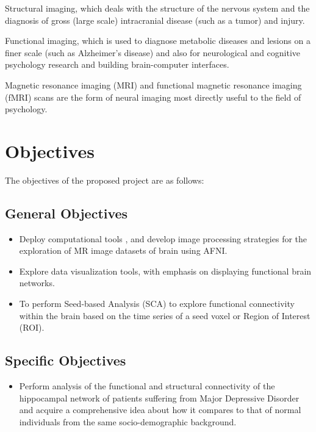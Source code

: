 \documentclass{article}
\begin{document}
Structural imaging, which deals with the structure of the nervous
system and the diagnosis of gross (large scale) intracranial disease
(such as a tumor) and injury.

Functional imaging, which is used to diagnose metabolic diseases and
lesions on a finer scale (such as Alzheimer's disease) and also for
neurological and cognitive psychology research and building
brain-computer interfaces.

Magnetic resonance imaging (MRI) and functional magnetic resonance
imaging (fMRI) scans are the form of neural imaging most directly
useful to the field of psychology.

\newpage

\section{Objectives}

The objectives of the proposed project are as follows:

\subsection{General Objectives}

\begin{itemize}

  \item Deploy computational tools , and develop image processing
    strategies for the exploration of MR image datasets of brain using
    AFNI.

  \item Explore data visualization tools, with emphasis on displaying
    functional brain networks.

  \item To perform Seed-based Analysis (SCA) to explore functional
    connectivity within the brain based on the time series of a seed
    voxel or Region of Interest (ROI).

\end{itemize}

\subsection{Specific Objectives}

\begin{itemize}

  \item Perform analysis of the functional and structural connectivity
    of the hippocampal network of patients suffering from Major
    Depressive Disorder and acquire a comprehensive idea about how it
    compares to that of normal individuals from the same
    socio-demographic background.



\end{itemize}
\end{document}
